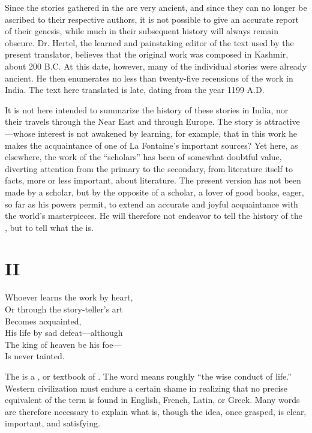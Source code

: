 Since the stories gathered in the  are very ancient,
and since they can no longer be ascribed to their respective authors,
it is not possible to give an accurate report of their genesis, while
much in their subsequent history will always remain obscure.
Dr. Hertel, the learned and painstaking editor of the text used by the
present translator, believes that the original work was composed in
Kashmir, about 200 B.C. At this date, however, many of the individual
stories were already ancient. He then enumerates no less than
twenty-five recensions of the work in India.  The text here translated
is late, dating from the year 1199 A.D.

It is not here intended to summarize the history of these stories in
India, nor their travels through the Near East and through Europe. The
story is attractive---whose interest is not awakened by learning, for
example, that in this work he makes the acquaintance of one of La
Fontaine's important sources? Yet here, as elsewhere, the work of the
``scholars'' has been of somewhat doubtful value, diverting attention
from the primary to the secondary, from literature itself to facts,
more or less important, about literature. The present version has not
been made by a scholar, but by the opposite of a scholar, a lover of
good books, eager, so far as his powers permit, to extend an accurate
and joyful acquaintance with the world's masterpieces. He will
therefore not endeavor to tell the history of the ,
but to tell what the  is.

\section{II}
\begin{pverse}[001]
Whoever learns the work by heart,\\
Or through the story-teller's art\\
  Becomes acquainted,\\
His life by sad defeat---although\\
The king of heaven be his foe---\\
  Is never tainted.
\end{pverse}


The  is a , or textbook of
. The word  means roughly ``the wise conduct of
life.''  Western civilization must endure a certain shame in realizing
that no precise equivalent of the term is found in English, French,
Latin, or Greek.  Many words are therefore necessary to explain what
 is, though the idea, once grasped, is clear, important, and
satisfying.

